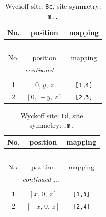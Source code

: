 \documentclass[fleqn,8pt]{jsarticle}
\begin{document}
\renewcommand{\arraystretch}{1.2}
\begin{longtable}{ccc}
\caption{Wyckoff site: {\tt 8c}, site symmetry: {\tt m..}}
 \\
 \hline \hline
No. & position & mapping \\ \hline \endfirsthead

\multicolumn{2}{l}{\tablename\ \thetable{}} \\
 \hline \hline
No. & position & mapping \\ \hline \endhead

 \hline \hline
\multicolumn{2}{r}{\footnotesize\it continued ...} \\ \endfoot

 \hline \hline
\multicolumn{2}{r}{} \\ \endlastfoot

1 & $\left[ 0,\, y,\, z \right]$ & {\tt [1,4]} \\ \hline
2 & $\left[ 0,\, - y,\, z \right]$ & {\tt [2,3]} \\
\end{longtable}
\renewcommand{\arraystretch}{1.2}
\begin{longtable}{ccc}
\caption{Wyckoff site: {\tt 8d}, site symmetry: {\tt .m.}}
 \\
 \hline \hline
No. & position & mapping \\ \hline \endfirsthead

\multicolumn{2}{l}{\tablename\ \thetable{}} \\
 \hline \hline
No. & position & mapping \\ \hline \endhead

 \hline \hline
\multicolumn{2}{r}{\footnotesize\it continued ...} \\ \endfoot

 \hline \hline
\multicolumn{2}{r}{} \\ \endlastfoot

1 & $\left[ x,\, 0,\, z \right]$ & {\tt [1,3]} \\ \hline
2 & $\left[ - x,\, 0,\, z \right]$ & {\tt [2,4]} \\
\end{longtable}
\renewcommand{\arraystretch}{1.2}
\end{document}
